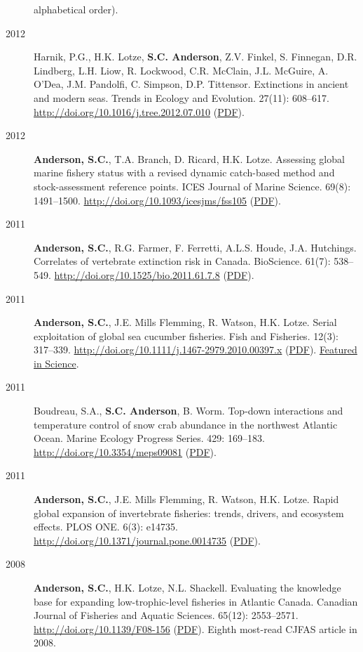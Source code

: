 \begin{description}
alphabetical order).
\item[2012]
Harnik, P.G., H.K. Lotze, \textbf{S.C. Anderson}, Z.V. Finkel, S.
Finnegan, D.R. Lindberg, L.H. Liow, R. Lockwood, C.R. McClain, J.L.
McGuire, A. O'Dea, J.M. Pandolfi, C. Simpson, D.P. Tittensor.
Extinctions in ancient and modern seas. Trends in Ecology and Evolution.
27(11): 608--617. \url{http://doi.org/10.1016/j.tree.2012.07.010}
(\href{https://dl.dropboxusercontent.com/u/254940/papers/Harnik_etal_2012_Extinctions_in_ancient_and_modern_seas.pdf}{PDF}).
\item[2012]
\textbf{Anderson, S.C.}, T.A. Branch, D. Ricard, H.K. Lotze. Assessing
global marine fishery status with a revised dynamic catch-based method
and stock-assessment reference points. ICES Journal of Marine Science.
69(8): 1491--1500. \url{http://doi.org/10.1093/icesjms/fss105}
(\href{http://icesjms.oxfordjournals.org/cgi/reprint/fss105?ijkey=pFRzMGEDycomI3X\&keytype=ref}{PDF}).
\item[2011]
\textbf{Anderson, S.C.}, R.G. Farmer, F. Ferretti, A.L.S. Houde, J.A.
Hutchings. Correlates of vertebrate extinction risk in Canada.
BioScience. 61(7): 538--549.
\url{http://doi.org/10.1525/bio.2011.61.7.8}
(\href{https://dl.dropboxusercontent.com/u/254940/papers/Anderson_etal_2011_BioScience_with_supplement.pdf}{PDF}).
\item[2011]
\textbf{Anderson, S.C.}, J.E. Mills Flemming, R. Watson, H.K. Lotze.
Serial exploitation of global sea cucumber fisheries. Fish and
Fisheries. 12(3): 317--339.
\url{http://doi.org/10.1111/j.1467-2979.2010.00397.x}
(\href{https://dl.dropboxusercontent.com/u/254940/papers/Anderson_etal_2011_seacucumbers_with_supplement.pdf}{PDF}).
\href{http://www.sciencemag.org/content/331/6014/129.1.full}{Featured in
Science}.
\item[2011]
Boudreau, S.A., \textbf{S.C. Anderson}, B. Worm. Top-down interactions
and temperature control of snow crab abundance in the northwest Atlantic
Ocean. Marine Ecology Progress Series. 429: 169--183.
\url{http://doi.org/10.3354/meps09081}
(\href{http://www.int-res.com/articles/meps_oa/m429p169.pdf}{PDF}).
\item[2011]
\textbf{Anderson, S.C.}, J.E. Mills Flemming, R. Watson, H.K. Lotze.
Rapid global expansion of invertebrate fisheries: trends, drivers, and
ecosystem effects. PLOS ONE. 6(3): e14735.
\url{http://doi.org/10.1371/journal.pone.0014735}
(\href{http://www.plosone.org/article/fetchObject.action?uri=info\%3Adoi\%2F10.1371\%2Fjournal.pone.0014735\&representation=PDF}{PDF}).
\item[2008]
\textbf{Anderson, S.C.}, H.K. Lotze, N.L. Shackell. Evaluating the
knowledge base for expanding low-trophic-level fisheries in Atlantic
Canada. Canadian Journal of Fisheries and Aquatic Sciences. 65(12):
2553--2571. \url{http://doi.org/10.1139/F08-156}
(\href{https://dl.dropboxusercontent.com/u/254940/papers/Anderson_etal_2008_knowledge.pdf}{PDF}).
Eighth most-read CJFAS article in 2008.
\end{description}

